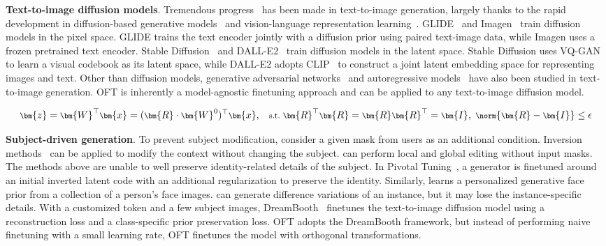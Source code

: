 \begin{itemize}[leftmargin=*,nosep]

\textbf{Text-to-image diffusion models}. Tremendous progress~\cite{saharia2022photorealistic,ramesh2022hierarchical,rombach2022high,gu2022vector,nichol2022glide} has been made in text-to-image generation, largely thanks to the rapid development in diffusion-based generative models~\cite{ho2020denoising,song2021score,song2021denoising,dhariwal2021diffusion} and vision-language representation learning~\cite{su2020vlbert,lu2019vilbert,radford2021learning,wang2021simvlm,li2022blip,li2023blip,alayrac2022flamingo,schuhmann2022laion}. GLIDE~\cite{nichol2022glide} and Imagen~\cite{saharia2022photorealistic} train diffusion models in the pixel space. GLIDE trains the text encoder jointly with a diffusion prior using paired text-image data, while Imagen uses a frozen pretrained text encoder. Stable Diffusion~\cite{rombach2022high} and DALL-E2~\cite{ramesh2022hierarchical} train diffusion models in the latent space. Stable Diffusion uses VQ-GAN~\cite{esser2021taming} to learn a visual codebook as its latent space, while DALL-E2 adopts CLIP~\cite{radford2021learning} to construct a joint latent embedding space for representing images and text. Other than diffusion models, generative adversarial networks~\cite{reed2016generative,zhang2017stackgan,xu2018attngan,li2019controllable} and autoregressive models~\cite{ramesh2021zero,ding2021cogview,wu2022nuwa,yuscaling} have also been studied in text-to-image generation. OFT is inherently a model-agnostic finetuning approach and can be applied to any text-to-image diffusion model.

\begin{equation}\label{eq:coft_general}
    \footnotesize
    \bm{z}=\bm{W}^\top\bm{x}=(\bm{R}\cdot\bm{W}^0)^\top\bm{x},~~~\text{s.t.}~\bm{R}^\top\bm{R}=\bm{R}\bm{R}^\top=\bm{I},~\norm{\bm{R}-\bm{I}}\leq \epsilon
\end{equation}

\textbf{Subject-driven generation}. To prevent subject modification, \cite{avrahami2022blended,nichol2022glide} consider a given mask from users as an additional condition. Inversion methods~\cite{choi2021ilvr,dhariwal2021diffusion,ramesh2022hierarchical,gal2022image} can be applied to modify the context without changing the subject. \cite{hertz2022prompt} can perform local and global editing without input masks. The methods above are unable to well preserve identity-related details of the subject. In Pivotal Tuning~\cite{roich2022pivotal}, a generator is finetuned around an initial inverted latent code with an additional regularization to preserve the identity. Similarly, \cite{nitzan2022mystyle} learns a personalized generative face prior from a collection of a person's face images. \cite{casanova2021instance} can generate difference variations of an instance, but it may lose the instance-specific details. With a customized token and a few subject images, DreamBooth~\cite{ruiz2023dreambooth} finetunes the text-to-image diffusion model using a reconstruction loss and a class-specific prior preservation loss. OFT adopts the DreamBooth framework, but instead of performing naive finetuning with a small learning rate, OFT finetunes the model with orthogonal transformations.


\end{itemize}
